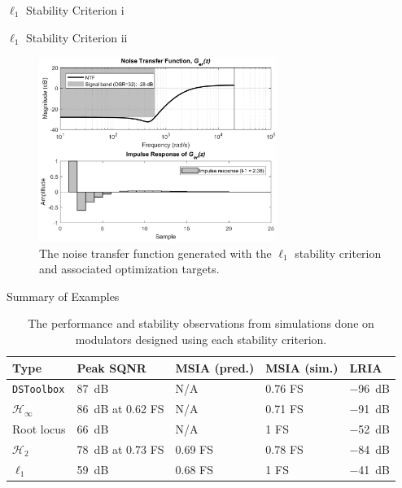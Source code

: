 \documentclass[10pt,usenames,dvipsnames]{beamer}
\begin{document}
{\begin{frame}{$\ell_1$ Stability Criterion i}
\end{frame}

\begin{frame}{$\ell_1$ Stability Criterion ii}

\begin{figure}
	\centering
	\includegraphics[height=6cm]{ntf-l1}
	\caption{The noise transfer function generated with the $\ell_1$ stability criterion and associated optimization targets.}
\end{figure}

\end{frame}

\begin{frame}{Summary of Examples}

\begin{table}
	\caption{The performance and stability observations from simulations done on modulators designed using each stability criterion.}
	\begin{tabular}{p{1.8cm} p{2.4cm} p{1.9cm} p{1.8cm} p{0.9cm}}
		\toprule
		\textbf{Type} & \textbf{Peak SQNR} & \textbf{MSIA (pred.)} & \textbf{MSIA (sim.)} & \textbf{LRIA} \\
		\midrule
		\texttt{DSToolbox} & \SI{87}{\deci\bel} & N/A & 0.76 FS & \SI{-96}{\deci\bel} \\
		$\mathcal{H}_\infty$ & \SI{86}{\deci\bel} at 0.62 FS & N/A & 0.71 FS & \SI{-91}{\deci\bel} \\
		Root locus & \SI{66}{\deci\bel} & N/A & 1 FS & \SI{-52}{\deci\bel} \\
		$\mathcal{H}_2$ & \SI{78}{\deci\bel} at 0.73 FS & 0.69 FS & 0.78 FS & \SI{-84}{\deci\bel} \\
		$\ell_1$ & \SI{59}{\deci\bel} & 0.68 FS & 1 FS & \SI{-41}{\deci\bel} \\
		\bottomrule
	\end{tabular}
\end{table}

\end{frame}
}
\end{document}
